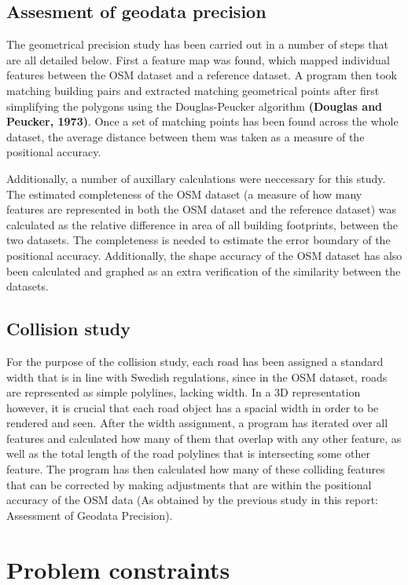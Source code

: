 \documentclass{kththesis}
\begin{document}
\subsection{Assesment of geodata precision}

The geometrical precision study has been carried out in a number of steps that are all detailed below.
First a feature map was found, which mapped individual features between the OSM dataset and a reference dataset.
A program then took matching building pairs and extracted matching geometrical points after first simplifying the polygons using the Douglas-Peucker algorithm \textbf{(Douglas and Peucker, 1973)}.
Once a set of matching points has been found across the whole dataset, the average distance between them was taken as a measure of the positional accuracy.

Additionally, a number of auxillary calculations were neccessary for this study.
The estimated completeness of the OSM dataset (a measure of how many features are represented in both the OSM dataset and the reference dataset) was calculated as the relative difference in area of all building footprints, between the two datasets.
The completeness is needed to estimate the error boundary of the positional accuracy.
Additionally, the shape accuracy of the OSM dataset has also been calculated and graphed as an extra verification of the similarity between the datasets.

\subsection{Collision study}

For the purpose of the collision study, each road has been assigned a standard width that is in line with Swedish regulations, since in the OSM dataset, roads are represented as simple polylines, lacking width.
In a 3D representation however, it is crucial that each road object has a spacial width in order to be rendered and seen.
After the width assignment, a program has iterated over all features and calculated how many of them that overlap with any other feature, as well as the total length of the road polylines that is intersecting some other feature.
The program has then calculated how many of these colliding features that can be corrected by making adjustments that are within the positional accuracy of the OSM data (As obtained by the previous study in this report: Assessment of Geodata Precision).

\section{Problem constraints}
\end{document}
